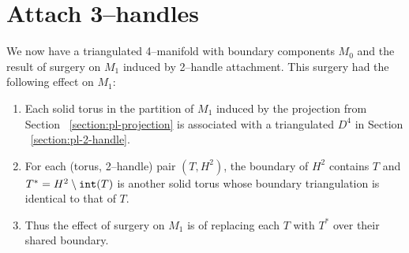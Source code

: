 \section{Attach 3--handles}

We now have a triangulated 4--manifold with boundary components $M_0$ and the result of surgery on $M_1$ induced by 2--handle attachment.
This surgery had the following effect on $M_1$:
\begin{enumerate}
	\item Each solid torus in the partition of $M_1$ induced by the projection from Section ~\ref{section:pl-projection} is associated with a triangulated $D^4$ in Section ~\ref{section:pl-2-handle}.
	\item For each (torus, 2--handle) pair $(T, H^2)$, the boundary of $H^2$ contains $T$ and $T^* = H^2\setminus \texttt{int}(T)$ is another solid torus whose boundary triangulation is identical to that of $T$.
	\item Thus the effect of surgery on $M_1$ is of replacing each $T$ with $T^*$ over their shared boundary.
\end{enumerate}

